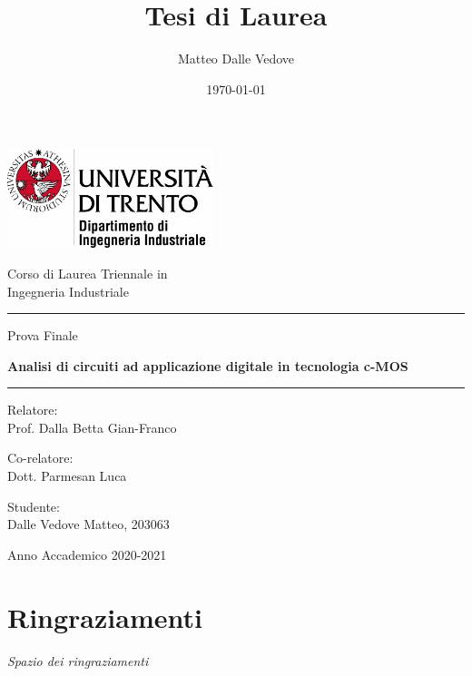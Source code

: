 \documentclass[10 pt,letterpaper,twoside,openright]{book}
\title{Tesi di Laurea}
\author{Matteo Dalle Vedove}
\date{\today}
\begin{document}
	\frontmatter
	
	\thispagestyle{empty}
	\begin{center}
		\includegraphics[width=6cm]{Immagini/logo}
		
		\vspace{2cm}
		{\Large Corso di Laurea Triennale in \\ Ingegneria Industriale}
		
		\vspace{6mm}
		
		\rule{5cm}{0.5pt}	
		\vspace{6mm}
		
		{\LARGE Prova Finale
		
		\vspace{6mm}
		
		\textbf{Analisi di circuiti ad applicazione digitale in tecnologia c-MOS}
		\vspace{6mm}
		
		\rule{5cm}{0.5pt}	
		 }
		
	\end{center}
	{ \large
	\vspace{0.5cm} \noindent
	Relatore:\\ Prof. Dalla Betta Gian-Franco
	
	\vspace{1.5cm} \noindent
	Co-relatore: \\ Dott. Parmesan Luca
	
	\vspace{1.5cm} \noindent
	Studente: \\
	Dalle Vedove Matteo, 203063
	
	\vspace{1.5cm}
	\begin{center}
		Anno Accademico 2020-2021
	\end{center}
	
	}

	\chapter*{Ringraziamenti}
	\begin{flushright}
		\textit{Spazio dei ringraziamenti}
	\end{flushright}
\end{document}
